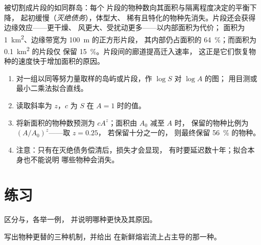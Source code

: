 \begin{proposition}[破碎化]\label{prop:b1:ecosystem-dynamics:fragmentation}
被切割成片段的如同群岛：每个
片段的物种数向其面积与隔离程度决定的平衡下降，
起初缓慢（\emph{灭绝债务}），体型大、
稀有且特化的物种先消失。片段还会获得边缘效应——更干燥、
风更大、受扰动更多——以内部面积为代价；
面积为 \qty{1}{km^2}、边缘带宽为 \qty{100}{m} 的正方形片段，
其内部仍占面积的 \qty{64}{\%}；而面积为 \qty{0.1}{km^2} 的片段仅
保留 \qty{15}{\%}。片段间的廊道提高迁入速率，
这正是它们恢复物种的速度快于增加面积的原因。
\end{proposition}

\begin{method}\label{met:b1:ecosystem-dynamics:sar}
\begin{enumerate}
  \item 对一组以同等努力量取样的岛屿或片段，作 $\log S$ 对 $\log A$ 的图；
        用目测或
        最小二乘法拟合直线。
  \item 读取斜率为 $z$，$c$ 为 $S$ 在 $A = 1$ 时的值。
  \item 将新面积的物种数预测为 $cA^z$；面积由 $A_0$ 减至 $A$ 时，
        保留的物种比例为 $(A/A_0)^z$——取 $z = 0.25$，
        若保留十分之一的，
        则最终保留 \qty{56}{\%} 的物种。
  \item 注意：只有在灭绝债务偿清后，损失才会显现，
        有时要延迟数十年；拟合本身也不能说明
        哪些物种会消失。
\end{enumerate}
\end{method}

\section{练习}

\begin{exercise}[$\star$]\label{exo:b1:ecosystem-dynamics:1}
区分与，各举一例，
并说明哪种更快及其原因。
\end{exercise}

\begin{exercise}[$\star$]\label{exo:b1:ecosystem-dynamics:2}
写出物种更替的三种机制，并给出
在新鲜熔岩流上占主导的那一种。
\end{exercise}

